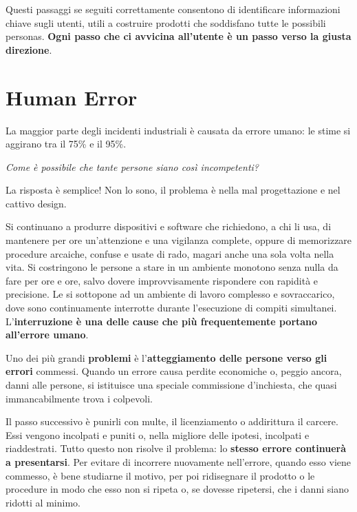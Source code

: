 \documentclass[a4paper,11pt,oneside]{book}
\begin{document}
Questi passaggi se seguiti correttamente consentono di identificare informazioni chiave sugli utenti, utili a costruire prodotti che soddisfano tutte le possibili personas. \textbf{Ogni passo che ci avvicina all'utente è un passo verso la giusta direzione}.

\pagebreak

\chapter{Human Error}

La maggior parte degli incidenti industriali è causata da errore umano:
le stime si aggirano tra il 75\% e il 95\%.

\begin{flushleft}
	\textit{Come è possibile che tante persone siano così incompetenti?}
\end{flushleft}

La risposta è semplice! Non lo sono, il problema è nella mal progettazione e nel cattivo design.

Si continuano a produrre dispositivi e software che richiedono, a chi li usa, di mantenere per ore un'attenzione e una vigilanza complete, oppure di memorizzare procedure arcaiche, confuse e usate di rado, magari anche una sola volta nella vita. Si costringono le persone a stare in un ambiente monotono senza nulla da fare per ore e ore, salvo dovere improvvisamente rispondere con rapidità e precisione. Le si sottopone ad un ambiente di lavoro complesso e sovraccarico, dove sono continuamente interrotte durante l'esecuzione di compiti simultanei. L'\textbf{interruzione è una delle cause che più frequentemente portano all'errore umano}.

Uno dei più grandi \textbf{problemi} è l'\textbf{atteggiamento delle persone verso gli errori} commessi. Quando un errore causa perdite economiche o, peggio ancora, danni alle persone, si istituisce una speciale commissione d'inchiesta, che quasi immancabilmente trova i colpevoli.

Il passo successivo è punirli con multe, il licenziamento o addirittura il carcere. Essi vengono incolpati
e puniti o, nella migliore delle ipotesi, incolpati e riaddestrati. Tutto questo non
risolve il problema: lo \textbf{stesso errore continuerà a presentarsi}.  Per evitare di incorrere nuovamente nell'errore, quando esso viene commesso, è bene  studiarne il motivo, per poi ridisegnare il prodotto o le procedure in modo che esso non si ripeta o, se dovesse ripetersi, che i danni siano ridotti al minimo.
\end{document}
